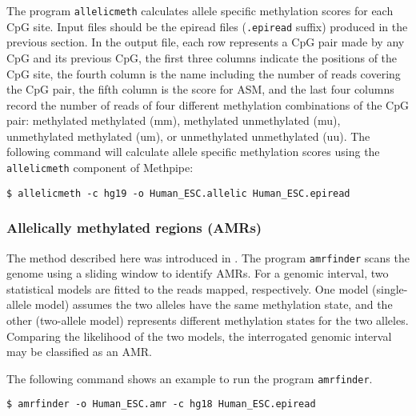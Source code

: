 \documentclass[10pt]{article}
\newcommand{\prog}[1]{\texttt{#1}}
\newcommand{\fn}[1]{\texttt{#1}}
\begin{document}
{{The program \prog{allelicmeth} calculates allele specific methylation
scores for each CpG site. Input files should be the epiread files
(\fn{.epiread} suffix) produced in the previous section. In the
output file, each row represents a CpG pair made by any CpG and its
previous CpG, the first three columns indicate the positions of the
CpG site, the fourth column is the name including the number of reads
covering the CpG pair, the fifth column is the score for ASM, and the
last four columns record the number of reads of four different
methylation combinations of the CpG pair: methylated methylated (mm),
methylated unmethylated (mu), unmethylated methylated (um), or
unmethylated unmethylated (uu). The following command will calculate
allele specific methylation scores using the \prog{allelicmeth}
component of Methpipe:

\begin{verbatim}
$ allelicmeth -c hg19 -o Human_ESC.allelic Human_ESC.epiread
\end{verbatim}

\subsubsection{Allelically methylated regions (AMRs)}

The method described here was introduced in \cite{fang2012genomic}.
The program \prog{amrfinder} scans the genome using a sliding window
to identify AMRs. For a genomic interval, two statistical models are
fitted to the reads mapped, respectively. One model (single-allele
model) assumes the two alleles have the same methylation state, and
the other (two-allele model) represents different methylation states
for the two alleles. Comparing the likelihood of the two models, the
interrogated genomic interval may be classified as an AMR.

The following command shows an example to run the program
\prog{amrfinder}.
\begin{verbatim}
$ amrfinder -o Human_ESC.amr -c hg18 Human_ESC.epiread
\end{verbatim}

}}
\end{document}
